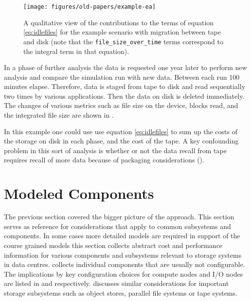 \documentclass{../../template/esiwace-report}
\begin{document}
\begin{figure} [htb]
\centering
  \texttt{[image: figures/old-papers/example-ea]}
\caption{A qualitative view of the contributions to the terms of equation \ref{eq:idlefiles} for the example scenario with migration between tape and disk (note that
the \texttt{file\_size\_over\_time} terms correspond to the integral term in that equation). }
\label{fig:exampleEA}
\end{figure}

In a phase of further analysis the data is requested one year later to perform new analysis and compare the simulation run with new data.
Between each run 100 minutes elapse.
Therefore, data is staged from tape to disk and read sequentially two times by various applications.
Then the data on disk is deleted immediately.
The changes of various metrics such as file size on the device, blocks read, and the integrated file size are shown in .

In this example one could use use equation \ref{eq:idlefiles} to sum up the costs of the storage on disk in each phase, and the cost of the tape.
A key confounding problem in this sort of analysis is whether or not the data recall from tape requires recall of more data because of packaging considerations ().



\section{Modeled Components}
\label{sec:modeling/components}

The previous section covered the bigger picture of the approach. This section serves as reference for considerations that apply to common subsystems and components.
In some cases more detailed models are required in support of the course grained models this section collects abstract cost and performance information for various components and subsystems relevant to storage systems in data centres.
 collects individual components that are usually not configurable.
The implications by key configuration choices for compute nodes and I/O nodes are listed in  and  respectively.
 discusses similar considerations for important storage subsystems such as object stores, parallel file systems or tape systems.
\end{document}
